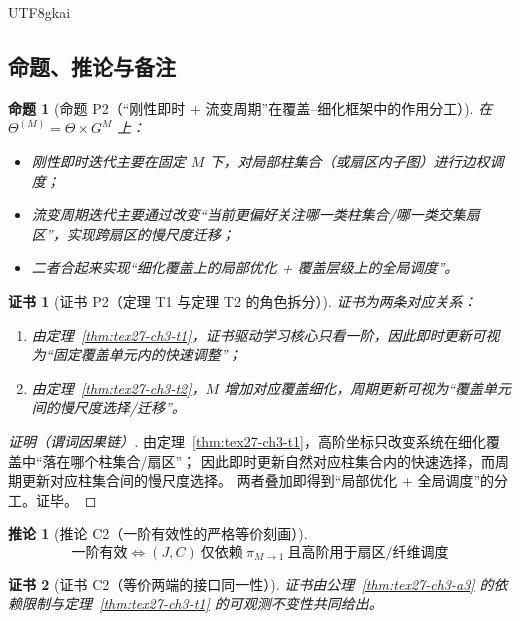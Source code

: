 \documentclass[12pt]{article}
\newtheorem{proposition}{命题}[section]
\newtheorem{corollary}{推论}[section]
\newtheorem{Certificate}{证书}[section]
\begin{document}
\begin{CJK*}{UTF8}{gkai}
\subsection{命题、推论与备注}
\label{subsec:tex27-ch3-others}

\begin{proposition}[命题 P2（“刚性即时 + 流变周期”在覆盖--细化框架中的作用分工）]
\label{prop:tex27-ch3-p2}
在 $\Theta^{(M)}=\Theta\times G^M$ 上：
\begin{itemize}
  \item 刚性即时迭代主要在固定 $M$ 下，对局部柱集合（或扇区内子图）进行边权调度；
  \item 流变周期迭代主要通过改变“当前更偏好关注哪一类柱集合/哪一类交集扇区”，实现跨扇区的慢尺度迁移；
  \item 二者合起来实现“细化覆盖上的局部优化 + 覆盖层级上的全局调度”。
\end{itemize}
\end{proposition}

\begin{Certificate}[证书 P2（定理 T1 与定理 T2 的角色拆分）]
\label{cert:tex27-ch3-p2}
证书为两条对应关系：
\begin{enumerate}
  \item 由定理~\ref{thm:tex27-ch3-t1}，证书驱动学习核心只看一阶，因此即时更新可视为“固定覆盖单元内的快速调整”；
  \item 由定理~\ref{thm:tex27-ch3-t2}，$M$ 增加对应覆盖细化，周期更新可视为“覆盖单元间的慢尺度选择/迁移”。
\end{enumerate}
\end{Certificate}

\begin{proof}[证明（谓词因果链）]
由定理~\ref{thm:tex27-ch3-t1}，高阶坐标只改变系统在细化覆盖中“落在哪个柱集合/扇区”；
因此即时更新自然对应柱集合内的快速选择，而周期更新对应柱集合间的慢尺度选择。
两者叠加即得到“局部优化 + 全局调度”的分工。证毕。
\end{proof}

\begin{corollary}[推论 C2（一阶有效性的严格等价刻画）]
\label{cor:tex27-ch3-c2}
\[
  \boxed{
  \text{一阶有效}
  \iff
  (J,C)\ \text{仅依赖}\ \pi_{M\to 1}\ \text{且高阶用于扇区/纤维调度}
  }
\]
\end{corollary}

\begin{Certificate}[证书 C2（等价两端的接口同一性）]
\label{cert:tex27-ch3-c2}
证书由公理~\ref{thm:tex27-ch3-a3} 的依赖限制与定理~\ref{thm:tex27-ch3-t1} 的可观测不变性共同给出。
\end{Certificate}


\end{CJK*}
\end{document}

